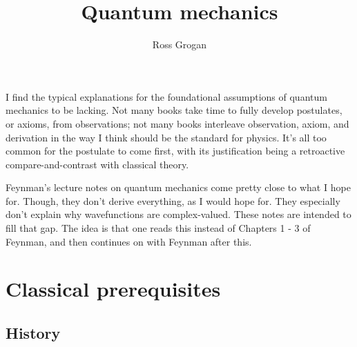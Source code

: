 \documentclass{article}
\title{Quantum mechanics}
\author{Ross Grogan}
\date{}
\begin{document}
	
\maketitle

I find the typical explanations for the foundational assumptions of quantum mechanics to be lacking. Not many books take time to fully develop postulates, or axioms, from observations; not many books interleave observation, axiom, and derivation in the way I think should be the standard for physics. It’s all too common for the postulate to come first, with its justification being a retroactive compare-and-contrast with classical theory. 

Feynman’s lecture notes on quantum mechanics come pretty close to what I hope for. Though, they don't derive everything, as I would hope for. They especially don't explain why wavefunctions are complex-valued. These notes are intended to fill that gap. The idea is that one reads this instead of Chapters 1 - 3 of Feynman, and then continues on with Feynman after this.

\section*{Classical prerequisites}

\subsection*{History}
\end{document}
